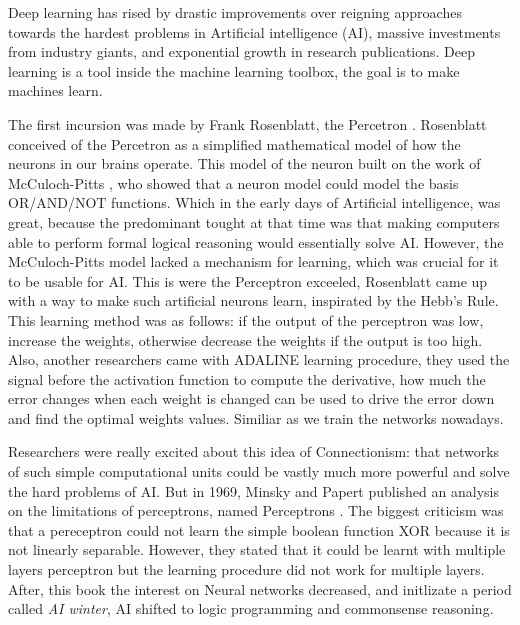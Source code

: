 \documentclass[12pt, a4paper, titlepage,twoside,openright]{article}
\begin{document}
Deep learning has rised by drastic improvements over reigning approaches towards the hardest problems in Artificial intelligence (AI), massive investments from industry giants, and exponential growth in research publications. Deep learning is a tool inside the machine learning toolbox, the goal is to make machines learn.

The first incursion was made by Frank Rosenblatt, the Percetron \cite{rosenblat}. Rosenblatt conceived of the Percetron as a simplified mathematical model of how the neurons in our brains operate. This model of the neuron built on the work of McCuloch-Pitts \cite{McCulloch}, who showed that a neuron model could model the basis OR/AND/NOT functions. Which in the early days of Artificial intelligence, was great, because the predominant tought at that time was that making computers able to perform formal logical reasoning would essentially solve AI. However, the McCuloch-Pitts model lacked a mechanism for learning, which was crucial for it to be usable for AI. This is were the Perceptron exceeled, Rosenblatt came up with a way to make such artificial neurons learn, inspirated by the Hebb's Rule. This learning method was as follows: if the output of the perceptron was low, increase the weights, otherwise decrease the weights if the output is too high. Also, another researchers came with ADALINE \cite{adaline} learning procedure, they used the signal before the activation function to compute the derivative, how much the error changes when each weight is changed can be used to drive the error down and find the optimal weights values. Similiar as we train the networks nowadays.

Researchers were really excited about this idea of Connectionism: that networks of such simple computational units could be vastly much more powerful and solve the hard problems of AI. But in 1969, Minsky and Papert  published an analysis on the limitations of perceptrons, named Perceptrons \cite{minsky69perceptrons}. The biggest criticism was that a pereceptron could not learn the simple boolean function XOR because it is not linearly separable. However, they stated that it could be learnt with multiple layers perceptron but the learning procedure did not work for multiple layers. After, this book the interest on Neural networks decreased, and initlizate a period called \textit{AI winter}, AI shifted to logic programming and commonsense reasoning.
\end{document}
